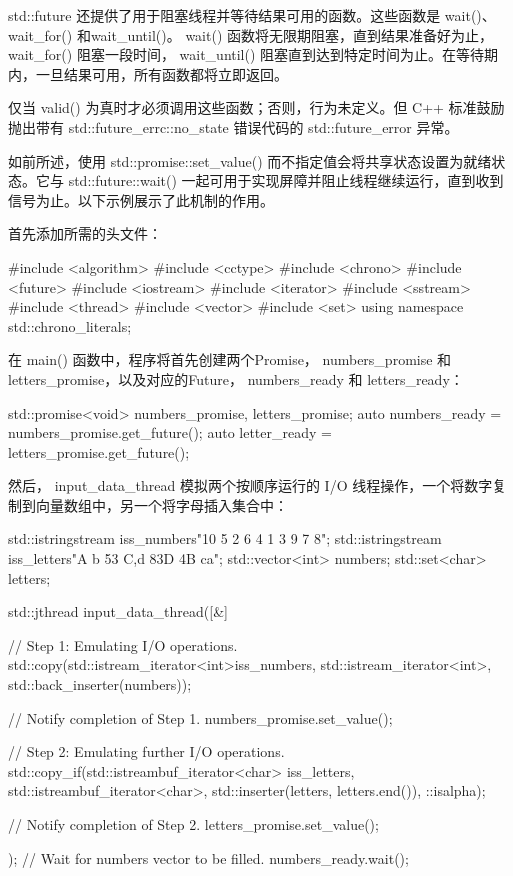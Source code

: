 
std::future 还提供了用于阻塞线程并等待结果可用的函数。这些函数是 wait()、 wait\_for() 和wait\_until()。 wait() 函数将无限期阻塞，直到结果准备好为止， wait\_for() 阻塞一段时间， wait\_until() 阻塞直到达到特定时间为止。在等待期内，一旦结果可用，所有函数都将立即返回。

仅当 valid() 为真时才必须调用这些函数；否则，行为未定义。但 C++ 标准鼓励抛出带有 std::future\_errc::no\_state 错误代码的 std::future\_error 异常。

如前所述，使用 std::promise::set\_value() 而不指定值会将共享状态设置为就绪状态。它与 std::future::wait() 一起可用于实现屏障并阻止线程继续运行，直到收到信号为止。以下示例展示了此机制的作用。

首先添加所需的头文件：

\begin{cpp}
#include <algorithm>
#include <cctype>
#include <chrono>
#include <future>
#include <iostream>
#include <iterator>
#include <sstream>
#include <thread>
#include <vector>
#include <set>
using namespace std::chrono_literals;
\end{cpp}

在 main() 函数中，程序将首先创建两个Promise， numbers\_promise 和 letters\_promise，以及对应的Future， numbers\_ready 和 letters\_ready：

\begin{cpp}
std::promise<void> numbers_promise, letters_promise;
auto numbers_ready = numbers_promise.get_future();
auto letter_ready = letters_promise.get_future();
\end{cpp}

然后， input\_data\_thread 模拟两个按顺序运行的 I/O 线程操作，一个将数字复制到向量数组中，另一个将字母插入集合中：

\begin{cpp}
std::istringstream iss_numbers{"10 5 2 6 4 1 3 9 7 8"};
std::istringstream iss_letters{"A b 53 C,d 83D 4B ca"};
std::vector<int> numbers;
std::set<char> letters;

std::jthread input_data_thread([&] {
    // Step 1: Emulating I/O operations.
    std::copy(std::istream_iterator<int>{iss_numbers},
              std::istream_iterator<int>{},
              std::back_inserter(numbers));

    // Notify completion of Step 1.
    numbers_promise.set_value();

    // Step 2: Emulating further I/O operations.
    std::copy_if(std::istreambuf_iterator<char>
                    {iss_letters},
                 std::istreambuf_iterator<char>{},
                 std::inserter(letters,
                               letters.end()),
                               ::isalpha);

    // Notify completion of Step 2.
    letters_promise.set_value();
});
// Wait for numbers vector to be filled.
numbers_ready.wait();
\end{cpp}

